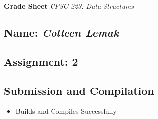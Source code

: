 \documentclass[10pt]{article}
\newcommand{\spc}{\vspace{12pt}}
\begin{document}
\pagestyle{empty}
\date{}

\noindent\textbf{Grade Sheet} \hfill \emph{CPSC 223: Data Structures}

\noindent\hrulefill

\spc
\subsection*{Name: {\em Colleen Lemak}}
\subsection*{Assignment: 2}

\spc\spc

\subsection*{Submission and Compilation}
\begin{itemize}
\item Builds and Compiles Successfully
\end{itemize}
\end{document}
